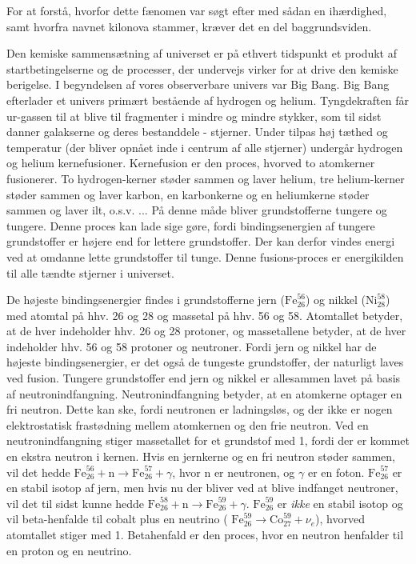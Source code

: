 \documentclass[twocolumn]{article}
\begin{document}
For at forstå, hvorfor dette fænomen var søgt efter med sådan en ihærdighed, samt hvorfra navnet kilonova stammer, kræver det en del baggrundsviden. 

Den kemiske sammensætning af universet er på ethvert tidspunkt et produkt af startbetingelserne og de processer, der undervejs virker for at drive den kemiske berigelse. I begyndelsen af vores observerbare univers var Big Bang. Big Bang efterlader et univers primært bestående af hydrogen og helium. Tyngdekraften får ur-gassen til at blive til fragmenter i mindre og mindre stykker, som til sidst danner galakserne og deres bestanddele - stjerner. Under tilpas høj tæthed og temperatur (der bliver opnået inde i centrum af alle stjerner) undergår hydrogen og helium kernefusioner. Kernefusion er den proces, hvorved to atomkerner fusionerer. To hydrogen-kerner støder sammen og laver helium, tre helium-kerner støder sammen og laver karbon, en karbonkerne og en heliumkerne støder sammen og laver ilt, o.s.v. ... På denne måde bliver grundstofferne tungere og tungere. Denne proces kan lade sige gøre, fordi bindingsenergien af tungere grundstoffer er højere end for lettere grundstoffer. Der kan derfor vindes energi ved at omdanne lette grundstoffer til tunge. Denne fusions-proces er energikilden til alle tændte stjerner i universet. 


De højeste bindingsenergier findes i grundstofferne jern ($\mathrm{Fe}_{26}^{56}$) og nikkel ($\mathrm{Ni}_{28}^{58}$) med atomtal på hhv. 26 og 28 og massetal på hhv. 56 og 58. Atomtallet betyder, at de hver indeholder hhv. 26 og 28 protoner, og massetallene betyder, at de hver indeholder hhv. 56 og 58 protoner og neutroner. Fordi jern og nikkel har de højeste bindingsenergier, er det også de tungeste grundstoffer, der naturligt laves ved fusion. Tungere grundstoffer end jern og nikkel er allesammen lavet på basis af neutronindfangning. Neutronindfangning betyder, at en atomkerne optager en fri neutron. Dette kan ske, fordi neutronen er ladningsløs, og der ikke er nogen elektrostatisk frastødning mellem atomkernen og den frie neutron. Ved en neutronindfangning stiger massetallet for et grundstof med 1, fordi der er kommet en ekstra neutron i kernen. Hvis en jernkerne og en fri neutron støder sammen, vil det hedde $\mathrm{Fe}_{26}^{56} + \mathrm{n} \rightarrow \mathrm{Fe}_{26}^{57} + \gamma$, hvor n er neutronen, og $\gamma$ er en foton. $\mathrm{Fe}_{26}^{57}$ er en stabil isotop af jern, men hvis nu der bliver ved at blive indfanget neutroner, vil det til sidst kunne hedde $\mathrm{Fe}_{26}^{58} + \mathrm{n} \rightarrow \mathrm{Fe}_{26}^{59} + \gamma$. $\mathrm{Fe}_{26}^{59}$ er \textit{ikke} en stabil isotop og vil beta-henfalde til cobalt plus en neutrino ( $\mathrm{Fe}_{26}^{59} \rightarrow  \mathrm{Co}_{27}^{59} + \nu_e$), hvorved atomtallet stiger med 1. Betahenfald er den proces, hvor en neutron henfalder til en proton og en neutrino.
\end{document}
